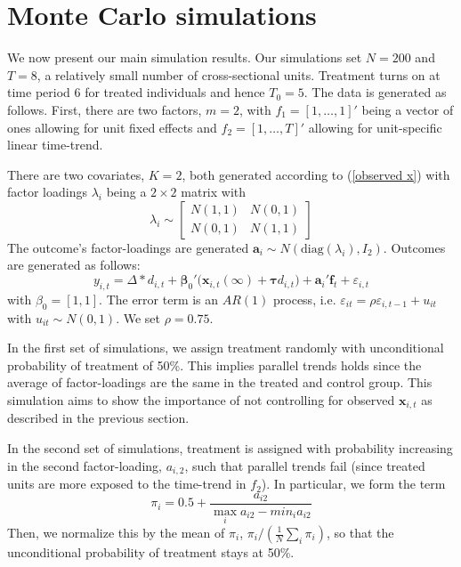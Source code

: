 \documentclass[12pt,fleqn]{article}
\def\*#1{\mathbf{#1}}
\def\+#1{\boldsymbol{#1}}
\begin{document}
\section{Monte Carlo simulations}

We now present our main simulation results. Our simulations set $N = 200$ and $T = 8$, a relatively small number of cross-sectional units. Treatment turns on at time period $6$ for treated individuals and hence $T_0 = 5$. The data is generated as follows. First, there are two factors, $m = 2$, with $f_1 = [1, \dots, 1]'$ being a vector of ones allowing for unit fixed effects and $f_2 = [1, \dots, T]'$ allowing for unit-specific linear time-trend. 

There are two covariates, $K = 2$, both generated according to (\ref{observed x}) with factor loadings $\lambda_i$ being a $2 \times 2$ matrix with 
$$
\lambda_i \sim
\begin{bmatrix}
    N(1, 1) & N(0, 1) \\
    N(0, 1) & N(1, 1)
\end{bmatrix}
$$
The outcome's factor-loadings are generated $\*a_i \sim N(\text{diag}(\lambda_i), I_2)$. Outcomes are generated as follows:
$$
y_{i,t} = \Delta * d_{i,t} + \+\beta_0' \big(\*x_{i,t}(\infty) + \+\tau d_{i,t}) + \*a_i' \*f_t + \varepsilon_{i,t}
$$
with $\beta_0 = [1, 1]$. The error term is an $AR(1)$ process, i.e. $\varepsilon_{it} = \rho \varepsilon_{i,t-1} + u_{it}$ with $u_{it} \sim N(0, 1)$. We set $\rho = 0.75$.

In the first set of simulations, we assign treatment randomly with unconditional probability of treatment of 50\%. This implies parallel trends holds since the average of factor-loadings are the same in the treated and control group. This simulation aims to show the importance of not controlling for observed $\*x_{i,t}$ as described in the previous section. 

In the second set of simulations, treatment is assigned with probability increasing in the second factor-loading, $a_{i,2}$, such that parallel trends fail (since treated units are more exposed to the time-trend in $f_2$). In particular, we form the term
$$
\pi_i = 0.5 + \frac{a_{i2}}{\max_i a_{i2} - min_i a_{i2}}
$$
Then, we normalize this by the mean of $\pi_i$, $\pi_i / (\frac{1}{N} \sum_i \pi_i)$, so that the unconditional probability of treatment stays at 50\%.
\end{document}
